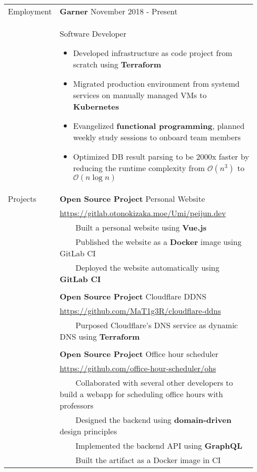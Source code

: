 \documentclass[letterpaper,12pt,oneside]{article}
\newcommand{\tabitem}{~~\llap{\textbullet}~~}
\newcommand{\smallurl}[1]{\small{\url{#1}}}
\begin{document}
\begin{longtable}{@{} l p{14cm}}
\Large{Employment}
& \large{\textbf{Garner}} November 2018 - Present\\
& Software Developer
\begin{itemize}[leftmargin=*,topsep=0pt,partopsep=0pt]
      \setlength\itemsep{0em}
      \item Developed infrastructure as code project from scratch using \textbf{Terraform}
      \item Migrated production environment from systemd services on manually managed VMs to \textbf{Kubernetes}
      \item Evangelized \textbf{functional programming}, planned weekly study sessions to onboard team members
      \item Optimized DB result parsing to be 2000x faster by reducing the runtime complexity from $\mathcal{O}(n^3)$ to $\mathcal{O}(n\log{}n)$
\end{itemize} \\
\Large{Projects}
& \textbf{Open Source Project} Personal Website  \\
& \smallurl{https://gitlab.otonokizaka.moe/Umi/peijun.dev} \\
& \tabitem Built a personal website using \textbf{Vue.js} \\
& \tabitem Published the website as a \textbf{Docker} image using GitLab CI \\
& \tabitem Deployed the website automatically using \textbf{GitLab CI} \\
& \\
& \textbf{Open Source Project} Cloudflare DDNS \\
& \smallurl{https://github.com/MaT1g3R/cloudflare-ddns} \\
& \tabitem Purposed Cloudflare's DNS service as dynamic DNS using \textbf{Terraform} \\
& \\
& \textbf{Open Source Project} Office hour scheduler \\
& \smallurl{https://github.com/office-hour-scheduler/ohs} \\
& \tabitem Collaborated with several other developers to build a webapp for scheduling office hours with professors \\
& \tabitem Designed the backend using \textbf{domain-driven} design principles \\
& \tabitem Implemented the backend API using \textbf{GraphQL} \\
& \tabitem Built the artifact as a Docker image in CI \\

\end{longtable}
\end{document}
